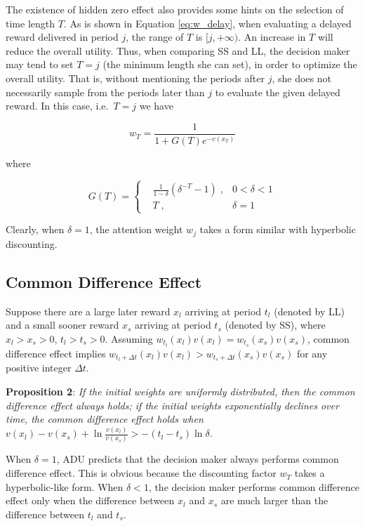 \documentclass[
  12pt,
]{article}
\begin{document}
The existence of hidden zero effect also provides some hints on the
selection of time length \(T\). As is shown in Equation
\ref{eq:w_delay}, when evaluating a delayed reward delivered in period
\(j\), the range of \(T\) is \([j,+\infty)\). An increase in \(T\) will
reduce the overall utility. Thus, when comparing SS and LL, the decision
maker may tend to set \(T=j\) (the minimum length she can set), in order
to optimize the overall utility. That is, without mentioning the periods
after \(j\), she does not necessarily sample from the periods later than
\(j\) to evaluate the given delayed reward. In this case, i.e.~\(T=j\)
we have

\[
w_T = \frac{1}{1+G(T)e^{-v(x_T)}}
\]

where

\[
G(T) = \left\{ \begin{aligned}
& \frac{1}{1-\delta}(\delta^{-T}-1) \; ,& 0<\delta<1\\
& T\; ,& \delta=1\
\end{aligned}
\right.
\]

Clearly, when \(\delta=1\), the attention weight \(w_j\) takes a form
similar with hyperbolic discounting.

\hypertarget{common-difference-effect}{%
\subsection{Common Difference Effect}\label{common-difference-effect}}

Suppose there are a large later reward \(x_l\) arriving at period
\(t_l\) (denoted by LL) and a small sooner reward \(x_s\) arriving at
period \(t_s\) (denoted by SS), where \(x_l>x_s>0\), \(t_l>t_s>0\).
Assuming \(w_{t_l}(x_l)v(x_l)=w_{t_s}(x_s)v(x_s)\), common difference
effect implies
\(w_{t_l+\Delta t}(x_l)v(x_l)>w_{t_s+\Delta t}(x_s)v(x_s)\) for any
positive integer \(\Delta t\)\citep{loewenstein_anomalies_1992}.

\textbf{Proposition 2}: \emph{If the initial weights are uniformly
distributed, then the common difference effect always holds; if the
initial weights exponentially declines over time, the common difference
effect holds when}
\(v(x_l)-v(x_s)+\ln\frac{v(x_l)}{v(x_s)}>-(t_l-t_s)\ln\delta\)\emph{.}

When \(\delta = 1\), ADU predicts that the decision maker always
performs common difference effect. This is obvious because the
discounting factor \(w_T\) takes a hyperbolic-like form. When
\(\delta<1\), the decision maker performs common difference effect only
when the difference between \(x_l\) and \(x_s\) are much larger than the
difference between \(t_l\) and \(t_s\).
\end{document}
